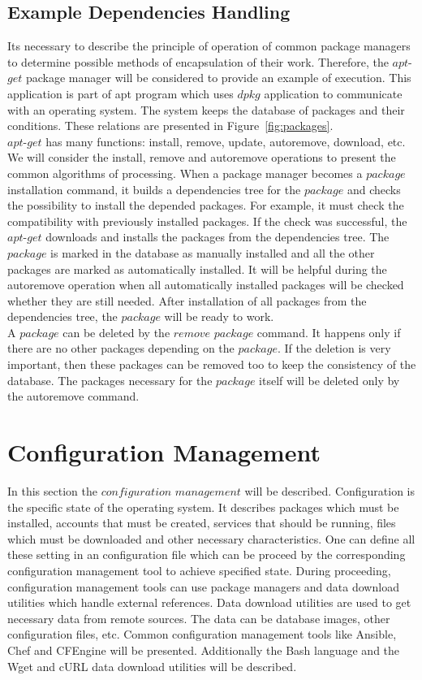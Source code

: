\subsection*{Example Dependencies Handling}\label{subs:depapt}
Its necessary to describe the principle of operation of common package managers to determine possible methods of encapsulation of their work.
Therefore, the $apt$-$get$ package manager will be considered to provide an example of execution.
This application is part of \gls{apt} program which uses $dpkg$ application to communicate with an operating system.
The system keeps the database of packages and their conditions.
These relations are presented in Figure~\ref{fig:packages}.\\
$apt$-$get$ has many functions: install, remove, update, autoremove, download, etc.
We will consider the install, remove and autoremove operations to present the common algorithms of processing.
When a package manager becomes a $package$ installation command, it builds a dependencies tree for the $package$ and checks the possibility to install the depended packages.
For example, it must check the compatibility with previously installed packages. 
If the check was successful, the $apt$-$get$ downloads and installs the packages from the dependencies tree.
The $package$ is marked in the database as manually installed and all the other packages are marked as automatically installed. 
It will be helpful during the autoremove operation when all automatically installed packages will be checked whether they are still needed.
After installation of all packages from the dependencies tree, the $package$ will be ready to work.\\
A $package$ can be deleted by the $remove$ $package$ command.
It happens only if there are no other packages depending on the $package$. 
If the deletion is very important, then these packages can be removed too to keep the consistency of the database. 
The packages necessary for the $package$ itself will be deleted only by the autoremove command.

\section{Configuration Management}\label{sec:confman}
In this section the $configuration$ $management$ will be described. 
Configuration is the specific state of the operating system.
It describes packages which must be installed, accounts that must be created, services that should be running, files which must be downloaded and other necessary characteristics.
One can define all these setting in an configuration file which can be proceed by the corresponding configuration management tool to achieve specified state.
During proceeding, configuration management tools can use package managers and data download utilities which handle external references.
Data download utilities are used to get necessary data from remote sources.
The data can be database images, other configuration files, etc.
Common configuration management tools like Ansible, Chef and CFEngine will be presented.
Additionally the Bash language and the Wget and cURL data download utilities will be described. 

